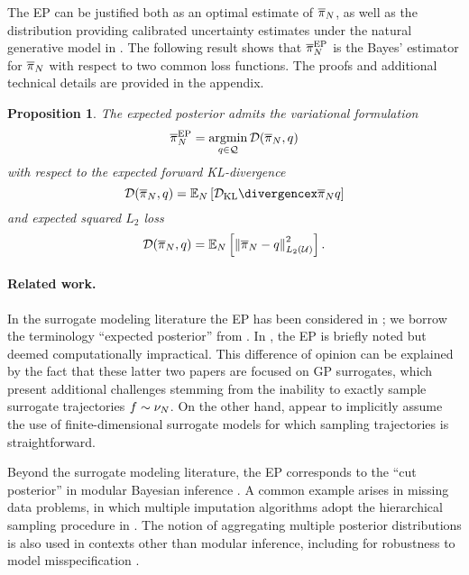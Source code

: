 \documentclass[12pt]{article}
\newtheorem{prop}{Proposition}
\begin{document}
The EP can be justified both as an optimal estimate of $\overline{\pi}_{N}$, as well as 
the distribution providing calibrated uncertainty estimates under the natural 
generative model in . The following result shows that 
$\overline{\pi}_{N}^{\mathrm{EP}}$ is the Bayes' estimator for $\overline{\pi}_{N}$ with respect to two
common loss functions. The proofs and additional technical details are provided 
in the appendix. 

\begin{prop} \label{prop:EP-variational}
The expected posterior admits the variational formulation 
\begin{equation}
\overline{\pi}_{N}^{\mathrm{EP}} = \operatorname*{argmin}_{q \in \mathcal{Q}} \mathcal{D}(\overline{\pi}_{N}, q)
\end{equation}
with respect to the expected forward KL-divergence
\begin{equation}
\mathcal{D}(\postNormEm, q) = \emE \left[\KL{\postNormEm}{q}\right]
\end{equation}
and expected squared $L_2$ loss
\begin{equation}
\mathcal{D}(\overline{\pi}_{N}, q) = \mathbb{E}_{N} \left[\left\lVert\overline{\pi}_{N} - q\right\rVert_{L_2(\mathcal{U})}^2\right].
\end{equation}
\end{prop}

\paragraph{Related work.} In the surrogate modeling literature the EP has been considered 
in \citet{trainDynamics,BurknerSurrogate,garegnani2021NoisyMCMC}; we borrow 
the terminology ``expected posterior'' from \citet{BurknerSurrogate}. In 
\citet{StuartTeck2,VehtariParallelGP}, the EP is briefly noted but deemed computationally impractical. 
This difference of opinion can be explained by the fact that these latter two papers are focused 
on GP surrogates, which present additional challenges stemming from the inability to exactly 
sample surrogate trajectories $f \sim \nu_{N}$. On the other hand, 
\citet{BurknerSurrogate,garegnani2021NoisyMCMC} appear to implicitly assume the use of 
finite-dimensional surrogate models for which sampling trajectories is straightforward.

Beyond the surrogate modeling literature, the EP corresponds to the ``cut posterior'' 
in modular Bayesian inference \citep{PlummerCut}. A common example arises in missing 
data problems, in which multiple imputation algorithms adopt the hierarchical 
sampling procedure in .
The notion of aggregating multiple posterior distributions is also used in contexts other than
modular inference, including for robustness to model misspecification \citep{BayesBag,BayesBag2}.
\end{document}
